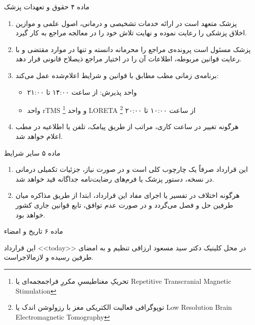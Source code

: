 \documentclass[12pt]{article}
\begin{document}
\vspace{0.5cm}
\large \XBZarBd
ماده ۴ حقوق و تعهدات پزشک
\normalsize \normalfont

\begin{enumerate}
\item
پزشک متعهد است در ارائه خدمات تشخیصی و درمانی، اصول علمی و موازین اخلاق پزشکی را رعایت نموده و نهایت تلاش خود را در معالجه مراجع به کار گیرد.
\item
پزشک مسئول است پرونده‌ی مراجع را محرمانه دانسته و تنها در موارد مقتضی و با رعایت قوانین مربوطه، اطلاعات آن را در اختیار مراجع ذیصلاح قانونی قرار دهد.
\item
برنامه‌ی زمانی مطب مطابق با قوانین و شرایط اعلام‌شده عمل می‌کند:

\begin{itemize}
\item
واحد پذیرش: از ساعت ۱۴:۰۰ تا ۲۱:۰۰
\item
 واحد rTMS
 \footnote{تحریکِ مغناطیسیِ مکررِ فراجمجمه‌ای یا Repetitive Transcranial Magnetic Stimulation}
 و واحد LORETA
 \footnote{توپوگرافی فعالیت الکتریکی مغز با رزولوشن اندک یا Low Resolution Brain Electromagnetic Tomography}
از ساعت  ۱۰:۰۰ تا ۲۰:۰۰
\end{itemize}

\item
هرگونه تغییر در ساعت کاری، مراتب از طریق پیامک، تلفن یا اطلاعیه در مطب اعلام خواهد شد.
\end{enumerate}

\vspace{0.5cm}
\large \XBZarBd
ماده ۵ سایر شرایط
\normalsize \normalfont

\begin{enumerate}
 \item


این قرارداد صرفاً یک چارچوب کلی است و در صورت نیاز، جزئیات تکمیلی درمانی در نسخه، دستور پزشک یا فرم‌های رضایت‌نامه جداگانه قید خواهد شد.
 \item
هرگونه اختلاف در تفسیر یا اجرای مفاد این قرارداد، ابتدا از طریق مذاکره میان طرفین حل و فصل می‌گردد و در صورت عدم توافق، تابع قوانین جاری کشور خواهد بود.
\end{enumerate}

\vspace{0.5cm}
\large \XBZarBd
ماده ۶ تاریخ و امضاء
\normalsize \normalfont

این قرارداد <<today>> در محل کلینیک دکتر سید مسعود ارزاقی تنظیم و به امضای طرفین رسیده و لازمالاجراست.
\end{document}
